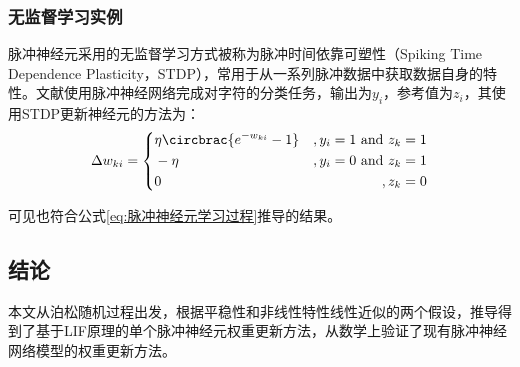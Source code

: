 \documentclass[11pt]{article}
\begin{document}
\subsubsection{无监督学习实例}
脉冲神经元采用的无监督学习方式被称为脉冲时间依靠可塑性（Spiking Time Dependence Plasticity，STDP），常用于从一系列脉冲数据中获取数据自身的特性。文献\cite{nesslerSTDPEnablesSpiking2009}使用脉冲神经网络完成对字符的分类任务，输出为$y_i$，参考值为$z_i$，其使用STDP更新神经元的方法为：
\begin{align}
  \Delta w_{ki}=\left\{\begin{aligned}
                     & \eta\circbrac{e^{-w_{ki}}-1} & ,y_i=1\text{ and }z_k=1  \\
                     & -\eta & ,y_i=0\text{ and }z_k=1 \\
                     & 0        & ,z_k=0
                  \end{aligned}\right.
\end{align}\par
可见也符合公式\ref{eq:脉冲神经元学习过程}推导的结果。
\subsection{结论}
本文从泊松随机过程出发，根据平稳性和非线性特性线性近似的两个假设，推导得到了基于LIF原理的单个脉冲神经元权重更新方法，从数学上验证了现有脉冲神经网络模型的权重更新方法。
\newpage
\printbibliography[heading=bibliography,title=参考文献]
\end{document}
